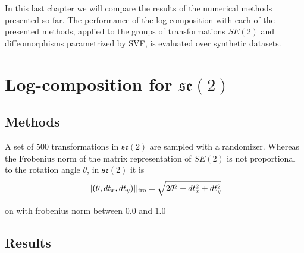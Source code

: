In this last chapter we will compare the results of the numerical methods presented so far.
The performance of the log-composition with each of the presented methods, applied to the groups of transformations $SE(2)$ and diffeomorphisms parametrized by SVF, is evaluated over synthetic datasets.

\section{Log-composition for $\mathfrak{se}(2)$}



\subsection{Methods}

A set of $500$ transformations in $\mathfrak{se}(2)$ are sampled with a randomizer. Whereas the Frobenius norm of the matrix representation of $SE(2)$ is not proportional to the rotation angle $\theta$, in $\mathfrak{se}(2)$ it is
\begin{align*}
\vert\lvert (\theta,dt_{x},dt_{y}) \rvert\vert_{\text{fro}} = \sqrt{2\theta^{2} + dt_{x}^2 + dt_{y}^2} 
\end{align*}




on with frobenius norm between $0.0$ and $1.0$


\subsection{Results}









